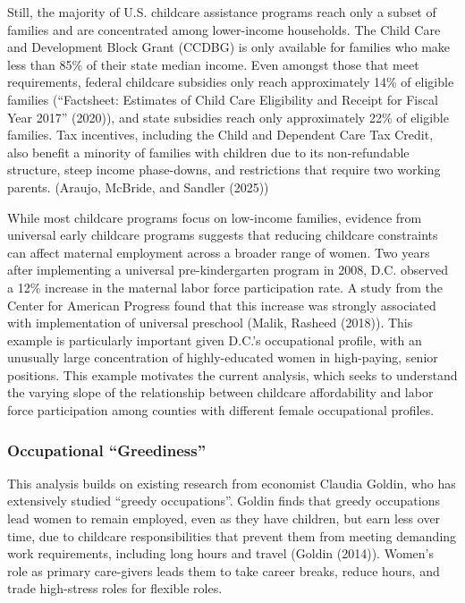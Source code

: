 \documentclass[
  letterpaper,
  DIV=11,
  numbers=noendperiod]{scrartcl}
\begin{document}
Still, the majority of U.S. childcare assistance programs reach only a
subset of families and are concentrated among lower-income households.
The Child Care and Development Block Grant (CCDBG) is only available for
families who make less than 85\% of their state median income. Even
amongst those that meet requirements, federal childcare subsidies only
reach approximately 14\% of eligible families ({``Factsheet: {Estimates}
of {Child} {Care} {Eligibility} and {Receipt} for {Fiscal} {Year}
2017''} (2020)), and state subsidies reach only approximately 22\% of
eligible families. Tax incentives, including the Child and Dependent
Care Tax Credit, also benefit a minority of families with children due
to its non-refundable structure, steep income phase-downs, and
restrictions that require two working parents. (Araujo, McBride, and
Sandler (2025))

While most childcare programs focus on low-income families, evidence
from universal early childcare programs suggests that reducing childcare
constraints can affect maternal employment across a broader range of
women. Two years after implementing a universal pre-kindergarten program
in 2008, D.C. observed a 12\% increase in the maternal labor force
participation rate. A study from the Center for American Progress found
that this increase was strongly associated with implementation of
universal preschool (Malik, Rasheed (2018)). This example is
particularly important given D.C.'s occupational profile, with an
unusually large concentration of highly-educated women in high-paying,
senior positions. This example motivates the current analysis, which
seeks to understand the varying slope of the relationship between
childcare affordability and labor force participation among counties
with different female occupational profiles.

\subsubsection{Occupational
``Greediness''}\label{occupational-greediness}

This analysis builds on existing research from economist Claudia Goldin,
who has extensively studied ``greedy occupations''. Goldin finds that
greedy occupations lead women to remain employed, even as they have
children, but earn less over time, due to childcare responsibilities
that prevent them from meeting demanding work requirements, including
long hours and travel (Goldin (2014)). Women's role as primary
care-givers leads them to take career breaks, reduce hours, and trade
high-stress roles for flexible roles.
\end{document}
